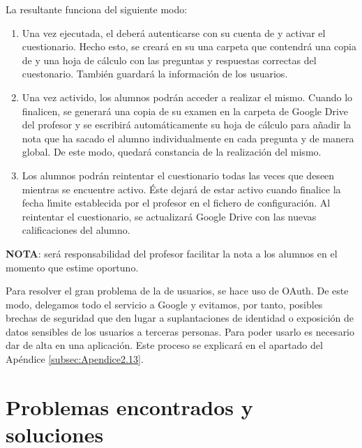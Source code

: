 La  resultante funciona del siguiente modo:
\begin{enumerate}
  \item Una vez ejecutada, el  deber\'a autenticarse con su cuenta de  y activar el cuestionario. Hecho esto, se crear\'a en su  
  una carpeta que contendr\'a una copia de  y una hoja de c\'alculo con las preguntas y respuestas correctas del cuestonario. Tambi\'en guardar\'a la informaci\'on
  de los usuarios. 
  
  \item Una vez activido, los alumnos podr\'an acceder a realizar el mismo. Cuando lo finalicen, se generar\'a una copia de su examen en la carpeta de Google Drive del
  profesor y se escribir\'a autom\'aticamente su hoja de c\'alculo para a\~{n}adir la nota que ha sacado el alumno individualmente en cada pregunta y de manera global.
  De este modo, quedar\'a constancia de la realizaci\'on del mismo.
 
  \item Los alumnos podr\'an reintentar el cuestionario todas las veces que deseen mientras se encuentre activo. \'Este dejar\'a de estar activo cuando finalice la fecha 
  l\'{\i}mite establecida por el profesor en el fichero de configuraci\'on. Al reintentar el cuestionario, se actualizar\'a Google Drive con las nuevas calificaciones
  del alumno.
\end{enumerate}

{\bfseries NOTA}: ser\'a responsabilidad del profesor facilitar la nota a los alumnos en el momento que estime oportuno.
\bigskip

Para resolver el gran problema de la  de usuarios, se hace uso de OAuth. De este modo, delegamos todo el servicio a Google y evitamos, por tanto,
posibles brechas de seguridad que den lugar a suplantaciones de identidad o exposici\'on de datos sensibles de los usuarios a terceras personas. Para poder usarlo
es necesario dar de alta en  una aplicaci\'on. Este proceso se explicar\'a en el apartado del Ap\'endice \ref{subsec:Apendice2.13}.
\bigskip


\section{Problemas encontrados y soluciones}
\label{5:sec:1}

